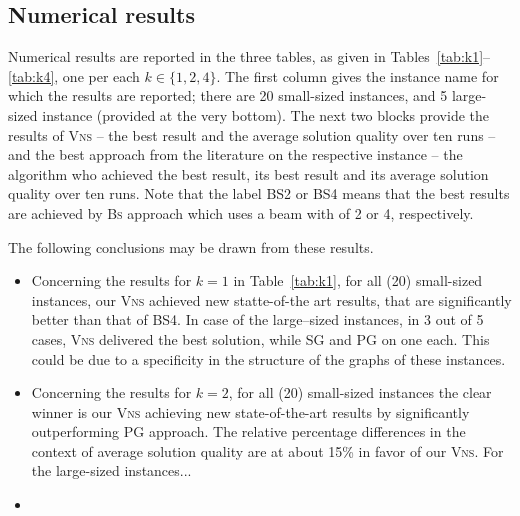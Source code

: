 \documentclass[dvipsnames,format=sigconf,anonymous=true,review=true]{acmart}
\begin{document}
\subsection{Numerical results }
 Numerical results are reported in the three tables, as given in Tables~\ref{tab:k1}--\ref{tab:k4}, one per each $k \in \{1, 2,4\}$. The first column gives the instance name for which the results are reported; there are 20 small-sized instances, and 5 large-sized instance (provided at the very bottom). The next two blocks provide the results of \textsc{Vns} -- the best result and the average solution quality over ten runs -- and the best approach from the literature on the respective instance -- the algorithm who achieved the best result, its best result  and its average solution quality over ten runs. Note that the label BS2 or BS4 means that the best results are achieved by \textsc{Bs} approach which uses a beam with of 2 or 4, respectively. 
 
   The following conclusions may be drawn from these results. 
   
   \begin{itemize}
   	\item  Concerning the results for $k=1$ in Table~\ref{tab:k1}, for all (20) small-sized instances, our \textsc{Vns} achieved new statte-of-the art   results, that are significantly better than that of BS4. In case of the large--sized instances, in 3 out of 5 cases, \textsc{Vns} delivered the best solution, while \textsc{SG} and \textsc{PG} on one each. This could be due to a specificity in the structure of the graphs of  these  instances.
   	\item Concerning the results for $k=2$, for all (20) small-sized instances the clear winner is our \textsc{Vns} achieving new state-of-the-art results by significantly outperforming \textsc{PG} approach. The relative percentage differences in the context of average solution quality are at about 15\% in favor of our \textsc{Vns}. For the large-sized instances...
   	\item 
   \end{itemize}
 
 
\end{document}
